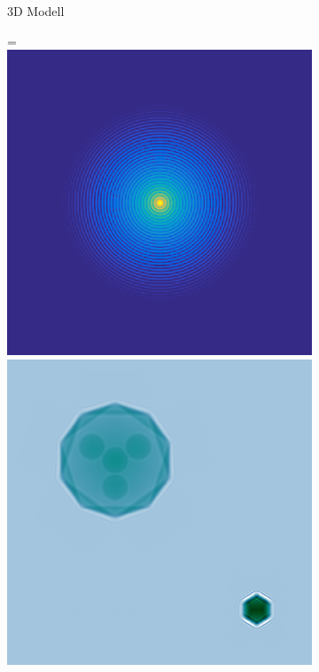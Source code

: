 \begin{figure}
\begin{subfigure}[b]{0.49\textwidth}
		\caption{3D Modell}
		\label{fig:komplexmodel}
	\end{subfigure}
	\begin{subfigure}[b]{0.49\textwidth}
		=\hbox{\includegraphics[width=\textwidth]{images/fig_sim_scatter_multislice-r100-bd1e-3.png}}
		\includegraphics[width=\textwidth]{images/fig_simholo_exitwave.png}

\end{subfigure}
\end{figure}
